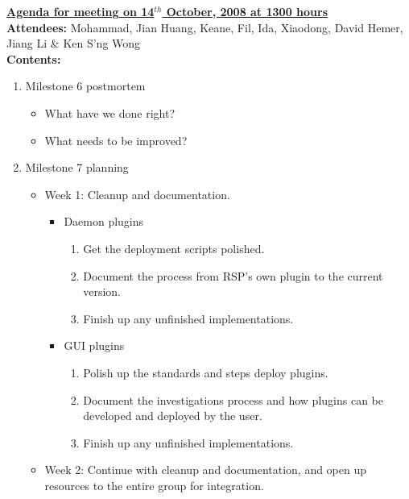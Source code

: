 \documentclass{letter}
\begin{document}
{\large \textbf{\underline{Agenda for meeting on 14$^{th}$ October, 2008 at 1300 hours}}}\\

\textbf{Attendees:} Mohammad, Jian Huang, Keane, Fil, Ida, Xiaodong, David Hemer, Jiang Li \& Ken S'ng Wong \\

\textbf{Contents:}

\begin{enumerate}
    \item Milestone 6 postmortem
        \begin{itemize}
            \item What have we done right?
            \item What needs to be improved?
        \end{itemize}
    \item Milestone 7 planning
        \begin{itemize}
            \item Week 1: Cleanup and documentation. 
                \begin{itemize}
                    \item Daemon plugins
                        \begin{enumerate}
                            \item Get the deployment scripts polished. 
                            \item Document the process from RSP's own plugin to the current version. 
                            \item Finish up any unfinished implementations.
                        \end{enumerate}
                    \item GUI plugins
                        \begin{enumerate}
                            \item Polish up the standards and steps deploy plugins. 
                            \item Document the investigations process and how plugins can be developed and deployed by the user. 
                            \item Finish up any unfinished implementations. 
                        \end{enumerate}
                \end{itemize}
            \item Week 2: Continue with cleanup and documentation, and open up resources to the entire group for integration. 

\end{itemize}
\end{enumerate}
\end{document}
